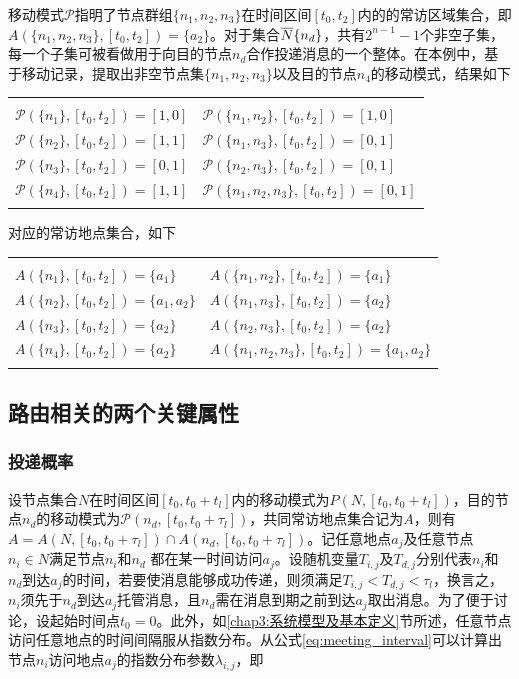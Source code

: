 移动模式$\mathcal{P}$指明了节点群组$\{n_1,n_2,n_3\}$在时间区间$[t_0,t_2]$内的的常访区域集合，即$A(\{n_1,n_2,n_3\},[t_0,t_2])=\{a_2\}$。对于集合$\overline{N}\\\{n_d\}$，共有$2^{n-1}-1$个非空子集，每一个子集可被看做用于向目的节点$n_d$合作投递消息的一个整体。在本例中，基于移动记录，提取出非空节点集$\{n_1,n_2,n_3\}$以及目的节点$n_4$的移动模式，结果如下\\
\begin{center}
\begin{tabular}{ll}
 & \\
$\mathcal{P}(\{n_1\},[t_0,t_2])=[1,0]$ & $\mathcal{P}(\{n_1,n_2\},[t_0,t_2])=[1,0]$ \\
$\mathcal{P}(\{n_2\},[t_0,t_2])=[1,1]$ & $\mathcal{P}(\{n_1,n_3\},[t_0,t_2])=[0,1]$ \\
$\mathcal{P}(\{n_3\},[t_0,t_2])=[0,1]$ & $\mathcal{P}(\{n_2,n_3\},[t_0,t_2])=[0,1]$ \\
$\mathcal{P}(\{n_4\},[t_0,t_2])=[1,1]$ & $\mathcal{P}(\{n_1,n_2,n_3\},[t_0,t_2])=[0,1]$ \\
 &
\end{tabular}
\end{center}
对应的常访地点集合，如下
\begin{center}
\begin{tabular}{ll}
 & \\
$A(\{n_1\},[t_0,t_2])=\{a_1\}$ & $A(\{n_1,n_2\},[t_0,t_2])=\{a_1\}$ \\
$A(\{n_2\},[t_0,t_2])=\{a_1,a_2\}$ & $A(\{n_1,n_3\},[t_0,t_2])=\{a_2\}$ \\
$A(\{n_3\},[t_0,t_2])=\{a_2\}$ & $A(\{n_2,n_3\},[t_0,t_2])=\{a_2\}$ \\
$A(\{n_4\},[t_0,t_2])=\{a_2\}$ & $A(\{n_1,n_2,n_3\},[t_0,t_2])=\{a_1,a_2\}$ \\
 &
\end{tabular}
\end{center}
\subsection{路由相关的两个关键属性}
\label{chap3:路由相关的两个关键属性}

\subsubsection{投递概率}

设节点集合$N$在时间区间$[t_0,t_0+t_l]$内的移动模式为$P(N,[t_0,t_0+t_l])$，目的节点$n_d$的移动模式为$\mathcal{P}(n_d,[t_0,t_0+\tau_l])$，共同常访地点集合记为$A$，则有$A=A(N,[t_0,t_0+\tau_l])\cap A(n_d,[t_0,t_0+\tau_l])$。记任意地点$a_j$及任意节点$n_i\in N$满足节点$n_i$和$n_d$
都在某一时间访问$a_j$。设随机变量$T_{i,j}$及$T_{d,j}$分别代表$n_i$和$n_d$到达$a_j$的时间，若要使消息能够成功传递，则须满足$T_{i,j}<T_{d,j}<\tau_l$，换言之，$n_i$须先于$n_d$到达$a_j$托管消息，且$n_d$需在消息到期之前到达$a_j$取出消息。为了便于讨论，设起始时间点$t_0=0$。此外，如\ref{chap3:系统模型及基本定义}节所述，任意节点访问任意地点的时间间隔服从指数分布。从公式\ref{eq:meeting_interval}可以计算出节点$n_i$访问地点$a_j$的指数分布参数$\lambda_{i,j}$，即

